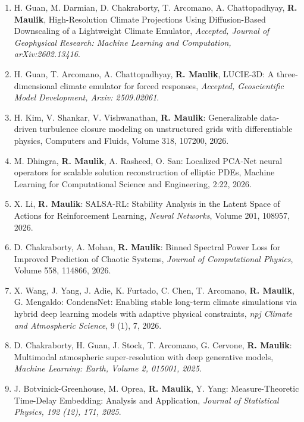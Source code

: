 \documentclass[letterpaper]{article}
\begin{document}
\begin{enumerate}

\item H. Guan, M. Darmian, D. Chakraborty, T. Arcomano, A. Chattopadhyay, \textbf{R. Maulik}, High-Resolution Climate Projections Using Diffusion-Based Downscaling of a Lightweight Climate Emulator, {\it Accepted, Journal of Geophysical Research: Machine Learning and Computation, arXiv:2602.13416}.

\item H. Guan, T. Arcomano, A. Chattopadhyay, \textbf{R. Maulik}, LUCIE-3D: A three-dimensional climate emulator for forced responses, {\it Accepted, Geoscientific Model Development, Arxiv: 2509.02061}.

\item H. Kim, V. Shankar, V. Vishwanathan, \textbf{R. Maulik}: Generalizable data-driven turbulence closure modeling on unstructured grids with differentiable physics, Computers and Fluids, Volume 318, 107200, 2026.

\item M. Dhingra, \textbf{R. Maulik}, A. Rasheed, O. San: Localized PCA-Net neural operators for scalable solution reconstruction of elliptic PDEs, Machine Learning for Computational Science and Engineering, 2:22, 2026.

\item X. Li, \textbf{R. Maulik}: SALSA-RL: Stability Analysis in the Latent Space of Actions for Reinforcement Learning, {\it Neural Networks}, Volume 201, 108957, 2026.

\item D. Chakraborty, A. Mohan, \textbf{R. Maulik}: Binned Spectral Power Loss for Improved Prediction of Chaotic Systems,  {\it Journal of Computational Physics}, Volume 558, 114866, 2026.

\item X. Wang, J. Yang, J. Adie, K. Furtado, C. Chen, T. Arcomano, \textbf{R. Maulik}, G. Mengaldo: CondensNet: Enabling stable long-term climate simulations via hybrid deep learning models with adaptive physical constraints, {\it npj Climate and Atmospheric Science}, 9 (1), 7, 2026.

\item D. Chakraborty, H. Guan, J. Stock, T. Arcomano, G. Cervone, \textbf{R. Maulik}: Multimodal atmospheric super-resolution with deep generative models, {\it Machine Learning: Earth, Volume 2, 015001, 2025.}

\item J. Botvinick-Greenhouse, M. Oprea, \textbf{R. Maulik}, Y. Yang: Measure-Theoretic Time-Delay Embedding: Analysis and Application, {\it Journal of Statistical Physics, 192 (12), 171, 2025}.


\end{enumerate}
\end{document}
